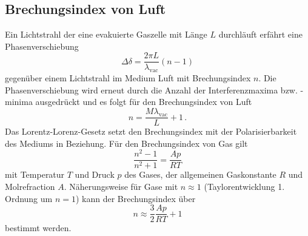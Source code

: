 \subsection{Brechungsindex von Luft}
Ein Lichtstrahl der eine evakuierte Gaszelle mit Länge $L$ durchläuft erfährt eine Phasenverschiebung
\begin{equation*}
    \Delta \delta =  \frac{2 \pi L}{\lambda_\text{vac}} (n-1)
\end{equation*}
gegenüber einem Lichtstrahl im Medium Luft mit Brechungsindex $n$.
Die Phasenverschiebung wird erneut durch die Anzahl der Interferenzmaxima bzw. -minima ausgedrückt und es folgt für den Brechungsindex von Luft
\begin{equation}
    n = \frac{M \lambda_\text{vac}}{L} + 1 \, .
    \label{eq:n_luft}
\end{equation}
Das Lorentz-Lorenz-Gesetz setzt den Brechungsindex mit der Polarisierbarkeit des Mediums in Beziehung.
Für den Brechungsindex von Gas gilt
\begin{equation*}
    \frac{n^2-1}{n^2+1} = \frac{A p}{R T}
\end{equation*}
mit Temperatur $T$ und Druck $p$ des Gases, der allgemeinen Gaskonstante $R$ und Molrefraction $A$.
Näherungsweise für Gase mit $n \approx 1$ (Taylorentwicklung 1. Ordnung um $n=1$) kann der Brechungsindex über
\begin{equation}
    n \approx \frac{3}{2} \frac{A p}{R T} + 1
    \label{eq:n_luft_lorentz}
\end{equation}
bestimmt werden.